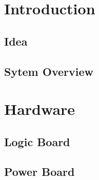 \documentclass{report}
\begin{document}



\tableofcontents
\listoffigures
\newpage
\listoftables

\newpage
\setcounter{roman}{\value{page}}
\setcounter{page}{1}

\chapter{Introduction}
\label{chap:intro}
\section{Idea}
\label{sec:idea}

\section{Sytem Overview}
\label{sec:system}


\chapter{Hardware}
\label{chap:hardware}
\section{Logic Board}
\label{sec:logic}

\section{Power Board}
\label{sec:power}


\end{document}
